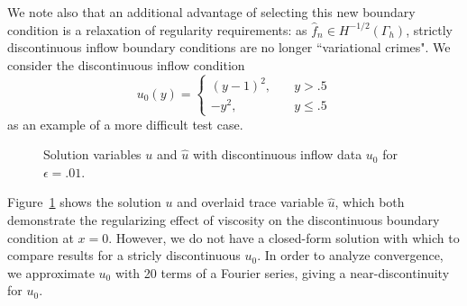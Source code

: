 \documentclass[11pt,onecolumn]{scrartcl}
\newcommand{\Gh}{\Gamma_h}
\begin{document}
We note also that an additional advantage of selecting this new boundary condition is a relaxation of regularity requirements: as $\widehat{f}_n \in H^{-1/2}(\Gh)$, strictly discontinuous inflow boundary conditions are no longer ``variational crimes".  We consider the discontinuous inflow condition
\[
u_0(y) = \begin{cases}
(y-1)^2, \quad &y>.5\\
-y^2, \quad &y\leq .5 
\end{cases}
\]
as an example of a more difficult test case. 

\begin{figure}[h!]
\centering
{}
\caption{Solution variables $u$ and $\widehat{u}$ with discontinuous inflow data $u_0$ for $\epsilon = .01$.}
\label{disc_sol}
\end{figure}
Figure~\ref{disc_sol} shows the solution $u$ and overlaid trace variable $\widehat{u}$, which both demonstrate the regularizing effect of viscosity on the discontinuous boundary condition at $x=0$. However, we do not have a closed-form solution with which to compare results for a stricly discontinuous $u_0$.  In order to analyze convergence, we approximate $u_0$ with 20 terms of a Fourier series, giving a near-discontinuity for $u_0$.  
\end{document}
